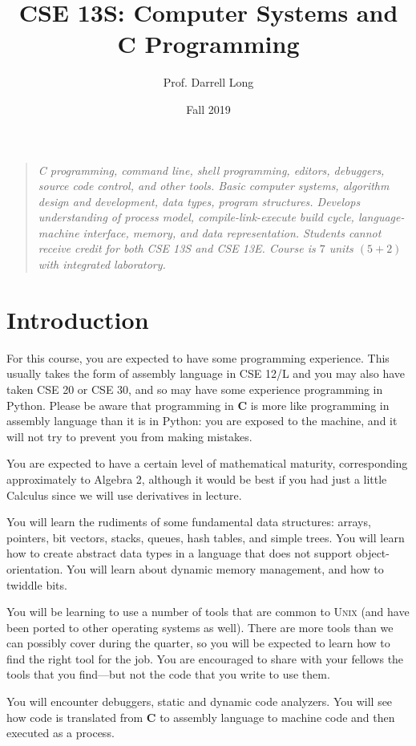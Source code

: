 \documentclass{article}
\title{CSE 13S: Computer Systems and \textbf{C} Programming}
\author{Prof.\xspace Darrell Long}
\date{Fall 2019}
\begin{document}
\maketitle
\begin{quotation}
\emph{
C programming, command line, shell programming, editors, debuggers,
source code control, and other tools. Basic computer systems,
algorithm design and development, data types, program structures.
Develops understanding of process model, compile-link-execute build
cycle, language-machine interface, memory, and data representation.
Students cannot receive credit for both CSE 13S and CSE 13E. Course
is $7$ units $(5 + 2)$ with integrated laboratory.
}
\end{quotation}

\section{Introduction}

For this course, you are expected to have some programming experience.
This usually takes the form of assembly language in CSE 12/L and you may
also have taken CSE 20 or CSE 30, and so may have some experience programming
in Python. Please be aware that programming in \textbf{C} is more
like programming in assembly language than it is in Python: you are
exposed to the machine, and it will not try to prevent you from
making mistakes.

You are expected to have a certain level of mathematical maturity,
corresponding approximately to Algebra 2, although it would be best if you had
just a little Calculus since we will use derivatives in lecture.

You will learn the rudiments of some fundamental data structures: arrays,
pointers, bit vectors, stacks, queues, hash tables, and simple trees. You will
learn how to create abstract data types in a language that does not support
object-orientation. You will learn about dynamic memory management, and how to
twiddle bits.

You will be learning to use a number of tools that are common to \textsc{Unix}
(and have been ported to other operating systems as well). There are more
tools than we can possibly cover during the quarter, so you will be expected
to learn how to find the right tool for the job. You are encouraged to share
with your fellows the tools that you find---but not the code that you write to
use them.

You will encounter debuggers, static and dynamic code analyzers. You will see
how code is translated from \textbf{C} to assembly language to machine code
and then executed as a process.
\end{document}

